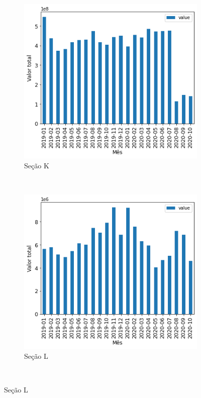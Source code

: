\begin{figure}[htb]
\begin{subfigure}[b]{0.45\textwidth}
        \includegraphics[scale=0.45]{images/base-de-dados-16.K-valor-mensal-por-secao.png}
        \caption{Seção K}
        \label{fig:pandemia:descritiva-16.K-valor-mensal-por-secao}
    \end{subfigure} ~ \quad
    \begin{subfigure}[b]{0.45\textwidth}
        \includegraphics[scale=0.45]{images/base-de-dados-16.L-valor-mensal-por-secao.png}
        \caption{Seção L}
        \label{fig:pandemia:descritiva-16.L-valor-mensal-por-secao}
    \end{subfigure} ~ \\
    \fautor
\end{figure}

